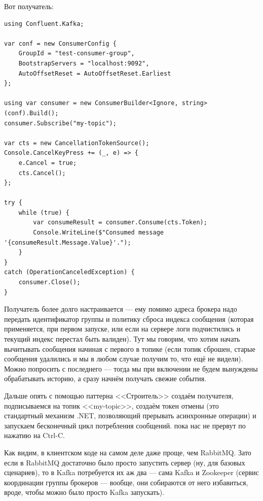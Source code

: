 \documentclass{../../text-style}
\begin{document}
Вот получатель: 

\begin{verbatim}
using Confluent.Kafka;

var conf = new ConsumerConfig {
    GroupId = "test-consumer-group",
    BootstrapServers = "localhost:9092",
    AutoOffsetReset = AutoOffsetReset.Earliest
};

using var consumer = new ConsumerBuilder<Ignore, string>(conf).Build();
consumer.Subscribe("my-topic");

var cts = new CancellationTokenSource();
Console.CancelKeyPress += (_, e) => {
    e.Cancel = true;
    cts.Cancel();
};

try {
    while (true) {
        var consumeResult = consumer.Consume(cts.Token);
        Console.WriteLine($"Consumed message '{consumeResult.Message.Value}'.");
    }
}
catch (OperationCanceledException) {
    consumer.Close();
}
\end{verbatim}

Получатель более долго настраивается --- ему помимо адреса брокера надо передать идентификатор группы и политику сброса индекса сообщения (которая применяется, при первом запуске, или если на сервере логи подчистились и текущий индекс перестал быть валиден). Тут мы говорим, что хотим начать вычитывать сообщения начиная с первого в топике (если топик сброшен, старые сообщения удалились и мы в любом случае получим то, что ещё не видели). Можно попросить с последнего --- тогда мы при включении не будем вынуждены обрабатывать историю, а сразу начнём получать свежие события.

Дальше опять с помощью паттерна <<Строитель>> создаём получателя, подписываемся на топик <<my-topic>>, создаём токен отмены (это стандартный механизм .NET, позволяющий прерывать асинхронные операции) и запускаем бесконечный цикл потребления сообщений. пока нас не прервут по нажатию на Ctrl-C.

Как видим, в клиентском коде на самом деле даже проще, чем RabbitMQ. Зато если в RabbitMQ достаточно было просто запустить сервер (ну, для базовых сценариев), то в Kafka потребуется их аж два --- сама Kafka и Zookeeper (сервис координации группы брокеров --- вообще, они собираются от него избавиться, вроде, чтобы можно было просто Kafka запускать).

\end{document}
